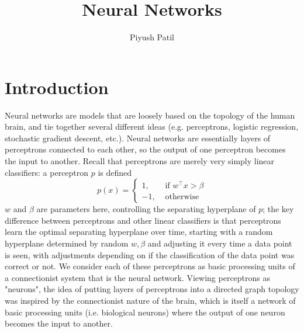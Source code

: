 \documentclass{article}
\begin{document}
\title{Neural Networks}
\author{Piyush Patil}
\maketitle

\section{Introduction}
Neural networks are models that are loosely based on the topology of the human brain, and tie together several different ideas (e.g. perceptrons, logistic regression, stochastic gradient descent, etc.). Neural networks are essentially layers of perceptrons connected to each other, so the output of one perceptron becomes the input to another. Recall that perceptrons are merely very simply linear classifiers: a perceptron $ p $ is defined
$$ p(x) = \begin{cases}
    1, &\text{ if } w^\intercal x > \beta \\
    -1, &\text{ otherwise }
\end{cases} $$
$ w $ and $ \beta $ are parameters here, controlling the separating hyperplane of $ p $; the key difference between perceptrons and other linear classifiers is that perceptrons learn the optimal separating hyperplane over time, starting with a random hyperplane determined by random $ w, \beta $ and adjusting it every time a data point is seen, with adjustments depending on if the classification of the data point was correct or not. We consider each of these perceptrons as basic processing units of a connectionist system that is the neural network. Viewing perceptrons as "neurons", the idea of putting layers of perceptrons into a directed graph topology was inspired by the connectionist nature of the brain, which is itself a network of basic processing units (i.e. biological neurons) where the output of one neuron becomes the input to another. 
\newline \newline
\end{document}
